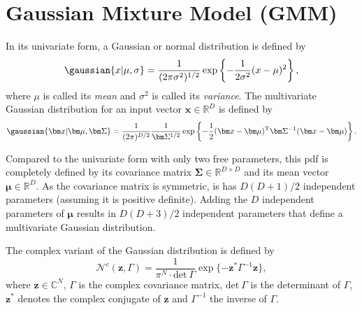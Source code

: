 \section{Gaussian Mixture Model (GMM)}
\label{sec:gmm}
In its univariate form, a Gaussian or normal distribution is defined by
\begin{equation}
	\gaussian{x\vert\mu,\sigma}=\frac{1}{(2\pi\sigma^2)^{1/2}}\exp\left\{-\frac{1}{2\sigma^2}(x-\mu)^2\right\},
\end{equation}
where $\mu$ is called its \textit{mean} and $\sigma^2$ is called its \textit{variance}.
The multivariate Gaussian distribution for an input vector $\bm x\in\mathbb{R}^D$ is defined by
\begin{equation}
	\gaussian{\bm x\vert\bm\mu,\bm\Sigma}=\frac{1}{(2\pi)^{D/2}}\frac{1}{\bm\Sigma^{1/2}}\exp\left\{-\frac{1}{2}(\bm x-\bm\mu)^{\text{T}} \bm\Sigma^{-1}(\bm x-\bm\mu)\right\}.
\end{equation}



Compared to the univariate form with only two free parameters, this \gls{pdf} is completely defined by its covariance matrix $\bm\Sigma\in\mathbb{R}^{D\times D}$ and its mean vector $\bm\mu\in\mathbb{R}^D$. As the covariance matrix is symmetric, is has $D(D+1)/2$ independent parameters (assuming it is positive definite). Adding the $D$ independent parameters of $\bm\mu$ results in $D(D+3)/2$ independent parameters that define a multivariate Gaussian distribution. 

The complex variant of the Gaussian distribution is defined by
\begin{equation}
    \mathcal{N}^c(\bm z,\Gamma)=\frac{1}{\pi^N\cdot\text{det}\ \Gamma}\exp\{ -\bm z^*\Gamma^{-1}\bm z \},
\end{equation}
where $\bm z\in\mathbb{C}^N$, $\Gamma$ is the complex covariance matrix, $\text{det}\ \Gamma$ is the determinant of $\Gamma$, $\bm z^*$ denotes the complex conjugate of $\bm z$ and $\Gamma^{-1}$ the inverse of $\Gamma$. 


